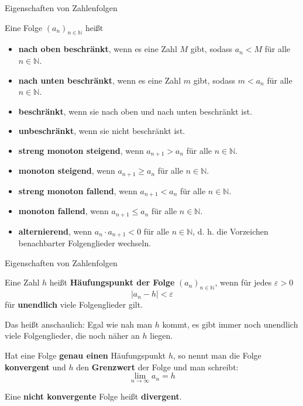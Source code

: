 \begin{frame}{Eigenschaften von Zahlenfolgen}
	\begin{definition}
		Eine Folge $(a_{n})_{n \in \mathbb{N}}$ heißt
		\begin{itemize}
			\item \textbf{nach oben beschränkt}, wenn es eine Zahl $M$ gibt, sodass $a_{n} < M$ für alle $n \in \mathbb{N}$.
			\item \textbf{nach unten beschränkt}, wenn es eine Zahl $m$ gibt, sodass $m < a_{n}$ für alle $n \in \mathbb{N}$.
			\item \textbf{beschränkt}, wenn sie nach oben und nach unten beschränkt ist.
			\item \textbf{unbeschränkt}, wenn sie nicht beschränkt ist.
			\item \textbf{streng monoton steigend}, wenn $a_{n+1}>a_{n}$ für alle $n \in \mathbb{N}$.
			\item \textbf{monoton steigend}, wenn $a_{n+1}\geq a_{n}$ für alle $n \in \mathbb{N}$.
			\item \textbf{streng monoton fallend}, wenn $a_{n+1}<a_{n}$ für alle $n \in \mathbb{N}$.
			\item \textbf{monoton fallend}, wenn $a_{n+1}\leq a_{n}$ für alle $n \in \mathbb{N}$.
			\item \textbf{alternierend}, wenn $a_{n} \cdot a_{n+1} < 0$ für alle $n \in \mathbb{N}$, d. h. die Vorzeichen benachbarter Folgenglieder wechseln.
		\end{itemize}
	\end{definition}
\end{frame}

\begin{frame}{Eigenschaften von Zahlenfolgen}
	\begin{definition}
		Eine Zahl $h$ heißt \textbf{Häufungspunkt der Folge} $(a_{n})_{n \in \mathbb{N}}$, wenn für jedes $\varepsilon>0$ 
		\[
			\left| a_{n} - h \right| < \varepsilon
		\]
		für \textbf{unendlich} viele Folgenglieder gilt.
		
		Das heißt anschaulich: Egal wie nah man $h$ kommt, es gibt immer noch unendlich viele Folgenglieder, die noch näher an $h$ liegen.
		
		Hat eine Folge \textbf{genau einen} Häufungspunkt $h$, so nennt man die Folge \textbf{konvergent} und $h$ den \textbf{Grenzwert} der Folge und man schreibt:
		\[
			\lim_{n \to \infty} a_{n} = h
		\]
		
		Eine \textbf{nicht konvergente} Folge heißt \textbf{divergent}.
	\end{definition}
\end{frame}


